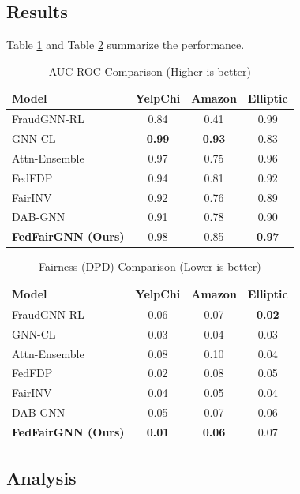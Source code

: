 \subsection{Results}
Table \ref{tab:auc} and Table \ref{tab:dpd} summarize the performance.

\begin{table}[htbp]
\caption{AUC-ROC Comparison (Higher is better)}
\begin{center}
\begin{tabular}{lccc}
\toprule
Model & YelpChi & Amazon & Elliptic \\
\midrule
FraudGNN-RL & 0.84 & 0.41 & 0.99 \\
GNN-CL & \textbf{0.99} & \textbf{0.93} & 0.83 \\
Attn-Ensemble & 0.97 & 0.75 & 0.96 \\
FedFDP & 0.94 & 0.81 & 0.92 \\
FairINV & 0.92 & 0.76 & 0.89 \\
DAB-GNN & 0.91 & 0.78 & 0.90 \\
\midrule
\textbf{FedFairGNN (Ours)} & 0.98 & 0.85 & \textbf{0.97} \\
\bottomrule
\end{tabular}
\label{tab:auc}
\end{center}
\end{table}

\begin{table}[htbp]
\caption{Fairness (DPD) Comparison (Lower is better)}
\begin{center}
\begin{tabular}{lccc}
\toprule
Model & YelpChi & Amazon & Elliptic \\
\midrule
FraudGNN-RL & 0.06 & 0.07 & \textbf{0.02} \\
GNN-CL & 0.03 & 0.04 & 0.03 \\
Attn-Ensemble & 0.08 & 0.10 & 0.04 \\
FedFDP & 0.02 & 0.08 & 0.05 \\
FairINV & 0.04 & 0.05 & 0.04 \\
DAB-GNN & 0.05 & 0.07 & 0.06 \\
\midrule
\textbf{FedFairGNN (Ours)} & \textbf{0.01} & \textbf{0.06} & 0.07 \\
\bottomrule
\end{tabular}
\label{tab:dpd}
\end{center}
\end{table}

\subsection{Analysis}
